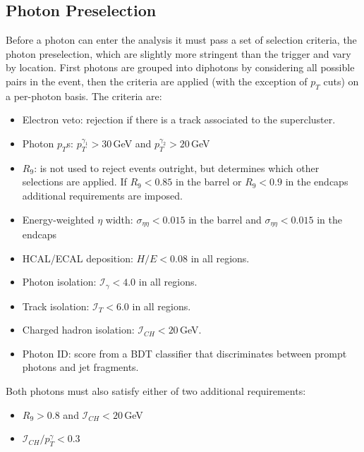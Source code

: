 \subsection{Photon Preselection}
Before a photon can enter the analysis it must pass a set of selection criteria, the photon preselection, which are slightly more stringent than the trigger and vary by location. First photons are grouped into diphotons by considering all possible pairs in the event, then the criteria are applied (with the exception of $p_{T}$ cuts) on a per-photon basis.
The criteria are:
\begin{itemize}[leftmargin=.5in,noitemsep]
    \item Electron veto: rejection if there is a track associated to the supercluster.
    \item Photon $p_{T}$s: $p_{T}^{\gamma_1} > 30$\,GeV and $p_{T}^{\gamma_2} > 20$\,GeV
    \item $R_{9}$: is not used to reject events outright, but determines which other selections are applied. If $R_{9} < 0.85$ in the barrel or $R_{9} < 0.9$ in the endcaps additional requirements are imposed. 
    \item Energy-weighted $\eta$ width: $\sigma_{\eta\eta} < 0.015$ in the barrel and $\sigma_{\eta\eta} < 0.015$ in the endcaps
    \item HCAL/ECAL deposition: $H/E < 0.08$ in all regions.
    \item Photon isolation: $\mathcal{I}_{\gamma} < 4.0$ in all regions. 
    \item Track isolation: $\mathcal{I}_{T} < 6.0$ in all regions.
    \item Charged hadron isolation: $\mathcal{I}_{CH} < 20$\,GeV.
    \item Photon ID: score from a BDT classifier that discriminates between prompt photons and jet fragments.
\end{itemize}
Both photons must also satisfy either of two additional requirements:
\begin{itemize}[leftmargin=.5in,noitemsep]
    \item $R_{9} > 0.8$ and $\mathcal{I}_{CH} < 20$\,GeV
    \item $\mathcal{I}_{CH}/p_{T}^{\gamma} < 0.3$
\end{itemize}

